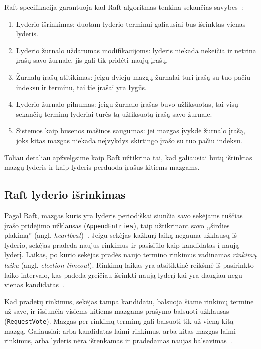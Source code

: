 \documentclass{VUMIFPSkursinis}
\begin{document}
Raft specifikacija garantuoja kad Raft algoritmas tenkina sekančias savybes~\cite{ongaro_consensus}: 

\begin{enumerate}
\item Lyderio išrinkimas: duotam lyderio terminui galiausiai bus išrinktas vienas lyderis.
\item Lyderio žurnalo uždarumas modifikacijoms: lyderis niekada nekeičia ir netrina įrašų savo žurnale, jis gali tik pridėti naujų įrašų.
\item Žurnalų įrašų atitikimas: jeigu dviejų mazgų žurnalai turi įrašą su tuo pačiu indeksu ir terminu, tai tie įrašai yra lygūs.
\item Lyderio žurnalo pilnumas: jeigu žurnalo įrašas buvo užfiksuotas, tai visų sekančių terminų lyderiai turės tą užfiksuotą įrašą savo žurnale.
\item Sistemos kaip būsenos mašinos saugumas: jei mazgas įvykdė žurnalo įrašą, joks kitas mazgas niekada neįvykdys skirtingo įrašo su tuo pačiu indeksu.
\end{enumerate}

Toliau detaliau apžvelgsime kaip Raft užtikrina tai, kad galiausiai būtų išrinktas mazgų lyderis ir kaip lyderis perduoda įrašus kitiems mazgams.

\subsection{Raft lyderio išrinkimas}

Pagal Raft, mazgas kuris yra lyderis periodiškai siunčia savo sekėjams tuščias įrašo pridėjimo užklausas (\texttt{AppendEntries}), taip užtikrinant savo ,,širdies plakimą'' (angl. \textit{heartbeat})~\cite{ongaro_consensus}. Jeigu sekėjas kažkurį laiką negauna užklausų iš lyderio, sekėjas pradeda naujus rinkimus ir pasisiūlo kaip kandidatas į naują lyderį. Laikas, po kurio sekėjas pradės naujo termino rinkimus vadinamas \textit{rinkimų laiku} (angl. \textit{election timeout}). Rinkimų laikas yra atsitiktinė reikšmė iš pasirinkto laiko intervalo, kas padeda greičiau išrinkti naują lyderį kai yra daugiau negu vienas kandidatas~\cite{ongaro_consensus}.

Kad pradėtų rinkimus, sekėjas tampa kandidatu, balsuoja šiame rinkimų termine už save, ir išsiunčia visiems kitiems mazgams prašymo balsuoti užklausas (\texttt{RequestVote}). Mazgas per rinkimų terminą gali balsuoti tik už vieną kitą mazgą. Galiausiai: arba kandidatas laimi rinkimus, arba kitas mazgas laimi rinkimus, arba lyderis nėra išrenkamas ir pradedamas naujas balsavimas~\cite{ongaro_consensus}.
\end{document}

